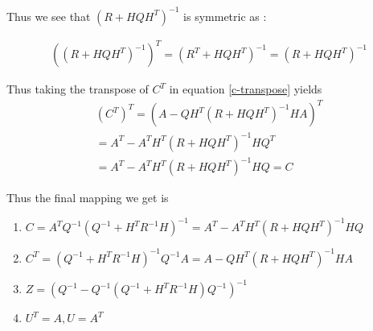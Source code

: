 \documentclass{tufte-handout}
\begin{document}
Thus we see that $(R + HQH^T)^{-1}$ is symmetric as : 

\begin{multline}
   ((R + HQH^T)^{-1} )^T =  (R^T + HQH^T)^{-1} = (R + HQH^T)^{-1}
\end{multline}

Thus taking  the transpose of  $C^T$ in equation \ref{c-transpose} yields 
\begin{multline}
   (C^T)^T = (A - QH^T (R + HQH^T)^{-1} H A)^T  \\
   = A^T - A^T H^T ( R +   HQH^T)^{-1} H Q^T \\ 
   =A^T - A^T H^T ( R +   HQH^T)^{-1} H Q  = C
\end{multline}

Thus the final mapping we get is 

\begin{enumerate}
    \item  $C = A^TQ^{-1}(Q^{-1} + H^T R^{-1}H)^{-1} = A^T - A^T H^T ( R +   HQH^T)^{-1} H Q  $
    \item  $C^T = (Q^{-1} + H^T R^{-1}H)^{-1}Q^{-1}A = A - QH^T (R + HQH^T)^{-1} H A$
    \item $Z  = (Q^{-1} - Q^{-1}(Q^{-1}  + H^TR^{-1}H) Q^{-1})^{-1} $
    \item $U^T = A, U = A^T$
\end{enumerate}



\end{document}
